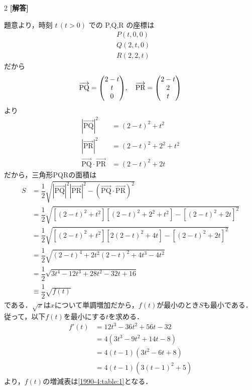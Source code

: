 \documentclass[../../main.tex]{subfiles}
\begin{document}
\setcounter{equation}{0}
\begin{oframed}
  
\end{oframed}
\setlength{\columnseprule}{0.4pt}
\begin{multicols}{2}
  {\bf [解答]}

  題意より，時刻 $t\, (t>0)$ での P,Q,R の座標は
  \begin{align}
    & P(t,0,0) \\
    & Q(2,t,0) \\
    & R(2,2,t)
  \end{align}
  だから
  \begin{align}
    \overrightarrow{\text{PQ}} = \mqty(2-t \\ t \\ 0 ), \quad \overrightarrow{\text{PR}} = \mqty(2-t \\ 2 \\ t)
  \end{align}
  より
  \begin{align}
    |\overrightarrow{\text{PQ}}|^2                   & = (2-t)^2+t^2     \\
    |\overrightarrow{\text{PR}}|^2                   & = (2-t)^2+2^2+t^2 \\
    \overrightarrow{\text{PQ}} \cdot \overrightarrow{\text{PR}} & = (2-t)^2+2t
  \end{align}
  だから，三角形PQRの面積は
  \begin{align}
    S
    & = \dfrac{1}{2} \sqrt{|\overrightarrow{\text{PQ}}|^2 |\overrightarrow{\text{PR}}|^2 - (\overrightarrow{\text{PQ}} \cdot \overrightarrow{\text{PR}})^2} \\
    & = \dfrac{1}{2} \sqrt{\left[(2-t)^2+t^2\right]\left[(2-t)^2+2^2+t^2\right] - \left[(2-t)^2+2t\right]^2}    \\
    & = \dfrac{1}{2} \sqrt{\left[(2-t)^2+t^2\right]\left[2(2-t)^2+4t\right] - \left[(2-t)^2+2t\right]^2}        \\
    & = \dfrac{1}{2} \sqrt{(2-t)^4+2t^2(2-t)^2+4t^3-4t^2}                                                       \\
    & = \dfrac{1}{2} \sqrt{3t^4-12t^3+28t^2-32t+16}                                                             \\
    & \equiv \dfrac{1}{2}\sqrt{f(t)}
  \end{align}
  である．$\sqrt{x}$は$x$について単調増加だから，$f(t)$が最小のとき$S$も最小である．
  従って，以下$f(t)$を最小にする$t$を求める．
  \begin{align}
    f'(t)
    & = 12t^3-36t^2+56t-32 \\
    & = 4(3t^3-9t^2+14t-8) \\
    & = 4(t-1)(3t^2-6t+8)  \\
    & = 4(t-1)(3(t-1)^2+5)
  \end{align}
  より，$f(t)$の増減表は\cref{1990-4:table:1}となる．


\end{multicols}
\end{document}
